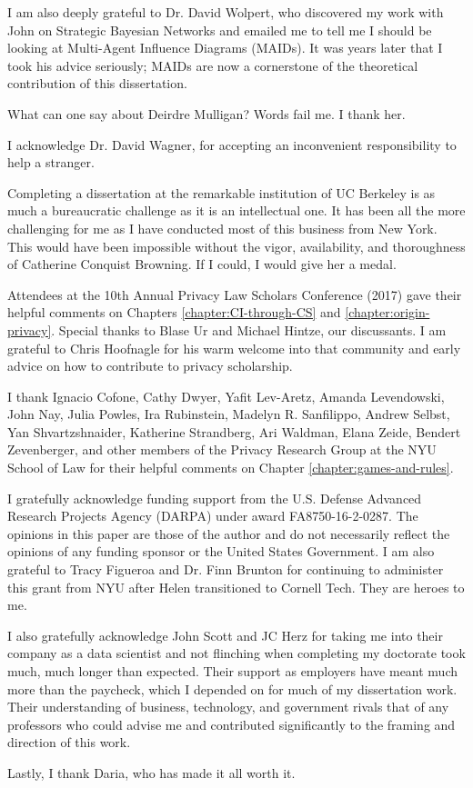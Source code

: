 \documentclass[../thesis.tex]{subfiles}
\begin{document}
 I am also deeply grateful to Dr. David Wolpert, who discovered
 my work with John on Strategic Bayesian Networks
 and emailed me to tell me I should be looking at
 Multi-Agent Influence Diagrams (MAIDs).
 It was years later that I took his advice seriously;
 MAIDs are now a cornerstone of the theoretical contribution
 of this dissertation.

 What can one say about Deirdre Mulligan?
 Words fail me.
 I thank her.

 I acknowledge Dr. David Wagner, for accepting an
 inconvenient responsibility to help a stranger.

 Completing a dissertation at the remarkable institution
 of UC Berkeley is as much a bureaucratic challenge as it
 is an intellectual one.
 It has been all the more challenging for me as I have conducted
 most of this business from New York.
 This would have been impossible without the vigor, availability,
 and thoroughness of Catherine Conquist Browning.
 If I could, I would give her a medal.
 
 Attendees at the 10th Annual Privacy Law Scholars Conference
 (2017) gave their helpful comments on
 Chapters \ref{chapter:CI-through-CS} and
 \ref{chapter:origin-privacy}.
 Special thanks to Blase Ur and Michael Hintze,
 our discussants.
 I am grateful to Chris Hoofnagle for his warm
 welcome into that community and early advice
 on how to contribute to privacy scholarship.

 I thank Ignacio Cofone, Cathy Dwyer, Yafit Lev-Aretz,
 Amanda Levendowski, John Nay, Julia Powles,
 Ira Rubinstein, Madelyn R. Sanfilippo, Andrew Selbst,
 Yan Shvartzshnaider,
 Katherine Strandberg, Ari Waldman, Elana Zeide,
 Bendert Zevenberger,  
 and other members of the Privacy Research Group at
 the NYU School of Law for their helpful comments
 on Chapter \ref{chapter:games-and-rules}.
 
 I gratefully acknowledge funding support 
 from the U.S. Defense Advanced Research Projects Agency (DARPA)
 under award FA8750-16-2-0287.
 The opinions in this paper are those of the author and do not
 necessarily reflect the opinions of any funding sponsor
 or the United States Government.
 I am also grateful to Tracy Figueroa and Dr. Finn Brunton
 for continuing to administer this grant from NYU after
 Helen transitioned to Cornell Tech.
 They are heroes to me.
 
 I also gratefully acknowledge John Scott and JC Herz
 for taking me into their company as a data scientist and
 not flinching when completing my doctorate took much,
 much longer than expected.
 Their support as employers have meant much more than the paycheck,
 which I depended on for much of my dissertation work.
 Their understanding of business, technology, and government
 rivals that of any professors who could advise me
 and contributed significantly to the framing and direction
 of this work.
 
 Lastly, I thank Daria, who has made it all worth it.
\end{document}
